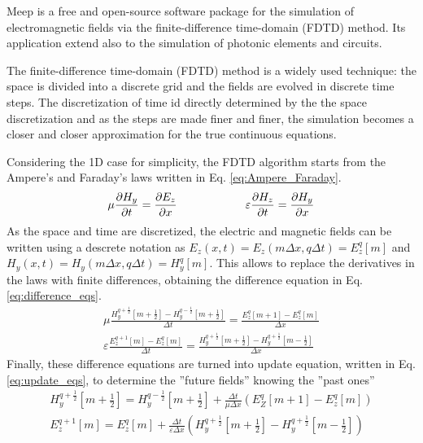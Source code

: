 Meep is a free and open-source software package for the simulation of electromagnetic fields via the finite-difference time-domain (FDTD) method.
Its application extend also to the simulation of photonic elements and circuits.  

The finite-difference time-domain (FDTD) method is a widely used technique: the space is divided into a discrete grid and the fields are evolved in discrete time steps.
The discretization of time id directly determined by the the space discretization and as the steps are made finer and finer, the simulation becomes a closer and closer approximation for the true continuous equations.

Considering the 1D case for simplicity, the FDTD algorithm starts from the Ampere's and Faraday's laws written in Eq. \ref*{eq:Ampere_Faraday}.
\begin{equation} \label{eq:Ampere_Faraday}
    \mu \pdv{H_y}{t} = \pdv{E_z}{x} \qquad\qquad\qquad \varepsilon \pdv{H_z}{t} = \pdv{H_y}{x}
\end{equation}
As the space and time are discretized, the electric and magnetic fields can be written using a descrete notation as \(E_z(x, t) = E_z (m\Delta x, q \Delta t) = E_z^q[m]\) and \(H_y(x, t) = H_y(m\Delta x, q \Delta t) = H_y^q[m]\). This allows to replace the derivatives in the laws with finite differences, obtaining the difference equation in Eq. \ref*{eq:difference_eqs}.
\begin{align}\label{eq:difference_eqs}
    \mu \frac{H_y^{q+\frac{1}{2}}[m+\frac{1}{2}] - H_y^{q-\frac{1}{2}}[m+\frac{1}{2}]}{\Delta t} = \frac{E_z^q[m+1] - E_z^q[m]}{\Delta x}
    \\
    \varepsilon\frac{E_z^{q+1}[m] - E_z^q[m]}{\Delta t} = \frac{H_y^{q+\frac{1}{2}}[m+\frac{1}{2}] - H_y^{q+\frac{1}{2}}[m-\frac{1}{2}]}{\Delta x}
\end{align}
Finally, these difference equations are turned into update equation, written in Eq. \ref*{eq:update_eqs}, to determine the ''future fields'' knowing the ''past ones''
\begin{align}\label{eq:update_eqs}
    H_y^{q+\frac{1}{2}} \left[ m+\frac{1}{2} \right] = H_y^{q-\frac{1}{2}} \left[ m+\frac{1}{2} \right] + \frac{\Delta t}{\mu \Delta x} \left( E_Z^q[m+1] - E_z^q[m] \right)
    \\
    E_z^{q+1} [m] = E_z^q[m] + \frac{\Delta t}{\varepsilon \Delta x} \left( H_y^{q+\frac{1}{2}}\left[ m+\frac{1}{2} \right] - H_y^{q+\frac{1}{2}}\left[ m-\frac{1}{2} \right] \right)
\end{align}